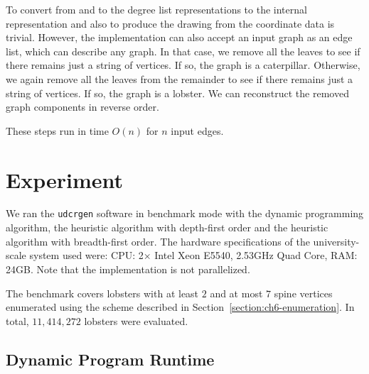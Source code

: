To convert from and to the degree list representations to the internal representation and also to produce the drawing from the coordinate data is trivial. However, the implementation can also accept an input graph as an edge list, which can describe any graph. In that case, we remove all the leaves to see if there remains just a string of vertices. If so, the graph is a caterpillar. Otherwise, we again remove all the leaves from the remainder to see if there remains just a string of vertices. If so, the graph is a lobster. We can reconstruct the removed graph components in reverse order.

These steps run in time $O(n)$ for $n$ input edges.

\section{Experiment}
\label{section:ch6-experiment}

We ran the \texttt{udcrgen} software in benchmark mode with the dynamic programming algorithm, the heuristic algorithm with depth-first order and the heuristic algorithm with breadth-first order. The hardware specifications of the university-scale system used were: CPU: 2× Intel Xeon E5540, 2.53GHz Quad Core, RAM: 24GB. Note that the implementation is not parallelized.

The benchmark covers lobsters with at least $2$ and at most $7$ spine vertices enumerated using the scheme described in Section~\ref{section:ch6-enumeration}. In total, $11,414,272$ lobsters were evaluated.

\subsection{Dynamic Program Runtime}

